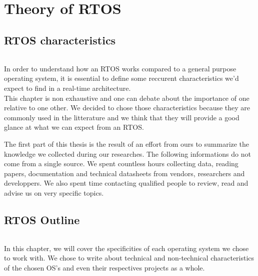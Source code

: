 \part{Theory of RTOS\label{part:rtos-theory}}

\chapter{RTOS characteristics}

\paragraph{}
In order to understand how an RTOS works compared to a general purpose operating system,
    it is essential to define some reccurent characteristics we'd expect to find in a real-time architecture.
\\
This chapter is non exhaustive and one can debate about the importance of one relative to one other.
We decided to chose those characteristics because they are commonly used in the litterature
    and we think that they will provide a good glance at what we can expect from an RTOS.

The first part of this thesis is the result of an effort from ours to summarize the knowledge we collected during our researches.
The following informations do not come from a single source.
We spent countless hours collecting data, reading papers, documentation and technical datasheets from vendors, researchers and developpers.
We also spent time contacting qualified people to review, read and advise us on very specific topics.










\chapter{RTOS Outline}

\paragraph{}
In this chapter, we will cover the specificities of each operating system we chose to work with.
We chose to write about technical and non-technical characteristics of the chosen OS's and even their respectives projects as a whole.

